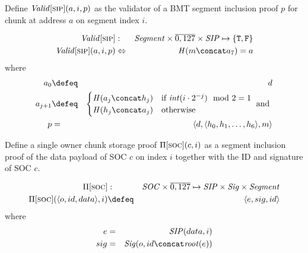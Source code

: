 \begin{definition}
\label{def:sip-validation}
Define  $\mathit{Valid}[\textsc{\lowercase{SIP}}](a, i, p)$ as the validator of a BMT segment inclusion proof $p$ for chunk at address $a$ on segment index $i$.

\begin{eqnarray}
\mathit{Valid}[\textsc{\lowercase{SIP}}]&:&\mathit{Segment}\times\overline{0,127}\times \mathit{SIP} \mapsto \{\mathtt{T,F}\}
\\
\mathit{Valid}[\textsc{\lowercase{SIP}}](a,i,p) &\Leftrightarrow&
\mathit{H}(m\concat a_7)=a
\end{eqnarray}where\begin{eqnarray}
a_0 &\defeq& d \\
a_{j+1}&\defeq& \begin{cases}
\mathit{H}(a_j\concat h_j) & \text{if }\mathit{int}(i\cdot2^{-j}) \mod 2 = 1\\
\mathit{H}(h_j\concat a_j) &\text{otherwise}
\end{cases}\text{ and }\\
p &= &\langle d,\langle h_0, h_1, \ldots, h_6\rangle, m\rangle
\end{eqnarray}
\end{definition}

 
\begin{definition}
\label{def:socproof}
Define a single owner chunk storage proof $\Pi[\textsc{\lowercase{SOC}}](c,i)$ as a segment inclusion proof of the data payload of SOC $c$ on index $i$ together with the ID and signature of SOC $c$.

\begin{eqnarray}
\Pi[\textsc{\lowercase{SOC}}] &:&\mathit{SOC}\times\overline{0,127}\mapsto\mathit{SIP}\times\mathit{Sig}\times\mathit{Segment}\\ 
\Pi[\textsc{\lowercase{SOC}}](\langle o,id,data\rangle,i)&\defeq&  \langle e, sig, id\rangle
\end{eqnarray}where\begin{eqnarray}
e&=&\mathit{SIP}(data,i)\\
sig&=&\mathit{Sig}(o,id\concat \mathit{root}(e))
\end{eqnarray}
\end{definition}

